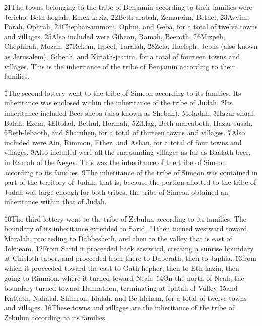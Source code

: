 \v{21}The towns belonging to the tribe of Benjamin according to their families were Jericho, Beth-hoglah, Emek-keziz, \v{22}Beth-arabah, Zemaraim, Bethel, \v{23}Avvim, Parah, Ophrah, \v{24}Chephar-ammoni, Ophni, and Geba, for a total of twelve towns and villages. \v{25}Also included were Gibeon, Ramah, Beeroth, \v{26}Mizpeh, Chephirah, Mozah, \v{27}Rekem, Irpeel, Taralah, \v{28}Zela, Haeleph, Jebus (also known as Jerusalem), Gibeah, and Kiriath-jearim, for a total of fourteen towns and villages. This is the inheritance of the tribe of Benjamin according to their families.

\v{1}The second lottery went to the tribe of Simeon according to its families. Its inheritance was enclosed within the inheritance of the tribe of Judah. \v{2}Its inheritance included Beer-sheba (also known as Shebah), Moladah, \v{3}Hazar-shual, Balah, Ezem, \v{4}Eltolad, Bethul, Hormah, \v{5}Ziklag, Beth-marcaboth, Hazar-susah, \v{6}Beth-lebaoth, and Sharuhen, for a total of thirteen towns and villages. \v{7}Also included were Ain, Rimmon, Ether, and Ashan, for a total of four towns and villages. \v{8}Also included were all the surrounding villages as far as Baalath-beer, in Ramah of the Negev. This was the inheritance of the tribe of Simeon, according to its families. \v{9}The inheritance of the tribe of Simeon was contained in part of the territory of Judah; that is, because the portion allotted to the tribe of Judah was large enough for both tribes, the tribe of Simeon obtained an inheritance within that of Judah.

\v{10}The third lottery went to the tribe of Zebulun according to its families. The boundary of its inheritance extended to Sarid, \v{11}then turned westward toward Maralah, proceeding to Dabbesheth, and then to the valley that is east of Jokneam. \v{12}From Sarid it proceeded back eastward, creating a sunrise boundary at Chisloth-tabor, and proceeded from there to Daberath, then to Japhia, \v{13}from which it proceeded toward the east to Gath-hepher, then to Eth-kazin, then going to Rimmon, where it turned toward Neah. \v{14}On the north of Neah, the boundary turned toward Hannathon, terminating at Iphtah-el Valley \v{15}and Kattath, Nahalal, Shimron, Idalah, and Bethlehem, for a total of twelve towns and villages. \v{16}These towns and villages are the inheritance of the tribe of Zebulun according to its families.

